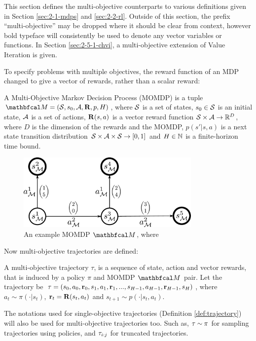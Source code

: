     This section defines the multi-objective counterparts to various definitions given in Section \ref{sec:2-1-mdps} and \ref{sec:2-2-rl}. Outside of this section, the prefix ``multi-objective'' may be dropped where it should be clear from context, however bold typeface will consistently be used to denote any vector variables or functions. In Section \ref{sec:2-5-1-chvi}, a multi-objective extension of Value Iteration  is given.

    To specify problems with multiple objectives, the reward function of an MDP changed to give a vector of rewards, rather than a scalar reward:
    \begin{defn}
        \label{def:mo_mdp}
        A \textnormal{Multi-Objective Markov Decision Process} (MOMDP) is a tuple $\bfcl{M}=(\cl{S},s_0,\cl{A},\bff{R},p,H)$, where $\mathcal{S}$ is a set of states, $s_0\in\mathcal{S}$ is an initial state, $\mathcal{A}$ is a set of actions, $\mathbf{R}(s,a)$ is a vector reward function $\mathcal{S}\times \mathcal{A}\rightarrow \mathbb{R}^D$, where $D$ is the dimension of the rewards and the MOMDP, $p(s' | s,a)$ is a next state transition distribution $\mathcal{S} \times \mathcal{A} \times \mathcal{S} \rightarrow [0,1]$ and $H\in\mathbb{N}$ is a finite-horizon time bound.
    \end{defn}

    \begin{figure}
        \centering\includegraphics[width=0.8\textwidth]{figures/ch2/example_momdp.pdf} 
        \caption[An example MDP $\cl{M}$.]{An example MOMDP $\bfcl{M}$, where }
        \label{fig:momdp_eg}
    \end{figure}

    Now multi-objective trajectories are defined:
    \begin{defn}
        \label{def:mo_trajectory}
        A \textnormal{multi-objective trajectory} $\tau$, is a sequence of state, action and vector rewards, that is induced by a policy $\pi$ and MOMDP $\bfcl{M}$ pair. Let the trajectory be $\mathbf{\tau} = (s_0, a_0, \mathbf{r}_0, s_1, a_1, \mathbf{r}_1, ..., s_{H-1}, a_{H-1}, \mathbf{r}_{H-1}, s_H)$, where $a_t \sim \pi(\cdot|s_t)$, $\mathbf{r}_t=\mathbf{R}(s_t,a_t)$ and $s_{t+1} \sim p(\cdot|s_t,a_t)$. 
        
        The notations used for single-objective trajectories (Definition \ref{def:trajectory}) will also be used for multi-objective trajectories too. Such as, $\mathbf{\tau}\sim\pi$ for sampling trajectories using policies, and $\mathbf{\tau}_{i:j}$ for truncated trajectories.
    \end{defn}

